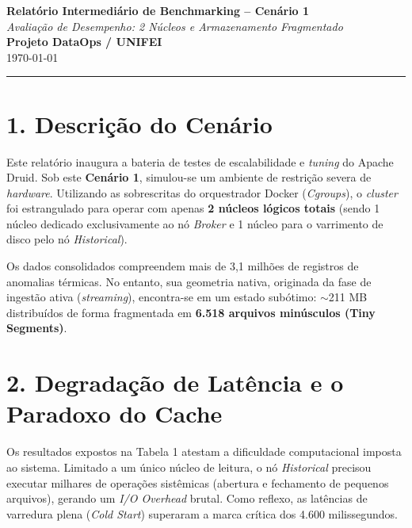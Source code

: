 \documentclass[12pt, a4paper]{article}
\begin{document}
\begin{center}
    \Large\textbf{Relatório Intermediário de Benchmarking -- Cenário 1} \\[0.2cm]
    \large\textit{Avaliação de Desempenho: 2 Núcleos e Armazenamento Fragmentado} \\[0.5cm]
    \normalsize\textbf{Projeto DataOps / UNIFEI} \\
    \small{\today}
\end{center}

\vspace{0.5cm}
\noindent\rule{\textwidth}{1pt}

\section*{1. Descrição do Cenário}
Este relatório inaugura a bateria de testes de escalabilidade e \textit{tuning} do Apache Druid. Sob este \textbf{Cenário 1}, simulou-se um ambiente de restrição severa de \textit{hardware}. Utilizando as sobrescritas do orquestrador Docker (\textit{Cgroups}), o \textit{cluster} foi estrangulado para operar com apenas \textbf{2 núcleos lógicos totais} (sendo 1 núcleo dedicado exclusivamente ao nó \textit{Broker} e 1 núcleo para o varrimento de disco pelo nó \textit{Historical}).

Os dados consolidados compreendem mais de 3,1 milhões de registros de anomalias térmicas. No entanto, sua geometria nativa, originada da fase de ingestão ativa (\textit{streaming}), encontra-se em um estado subótimo: $\sim$211 MB distribuídos de forma fragmentada em \textbf{6.518 arquivos minúsculos (Tiny Segments)}.

\section*{2. Degradação de Latência e o Paradoxo do Cache}
Os resultados expostos na Tabela 1 atestam a dificuldade computacional imposta ao sistema. Limitado a um único núcleo de leitura, o nó \textit{Historical} precisou executar milhares de operações sistêmicas (abertura e fechamento de pequenos arquivos), gerando um \textit{I/O Overhead} brutal. Como reflexo, as latências de varredura plena (\textit{Cold Start}) superaram a marca crítica dos 4.600 milissegundos.
\end{document}
